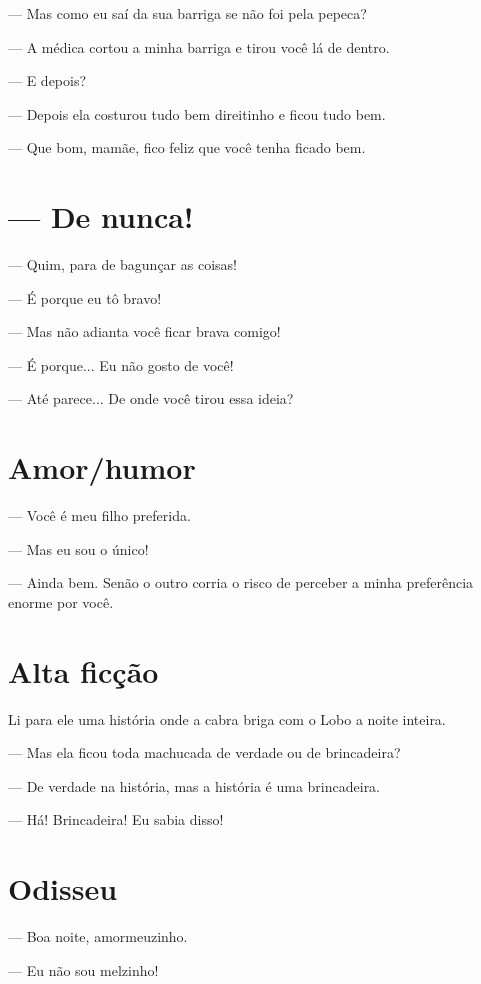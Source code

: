 {{--- Mas como eu saí da sua barriga se não foi pela pepeca?

--- A médica cortou a minha barriga e tirou você lá de dentro.

--- E depois?

--- Depois ela costurou tudo bem direitinho e ficou tudo bem.

--- Que bom, mamãe, fico feliz que você tenha ficado bem.

\chapter{--- De nunca!}\label{de-nunca}

--- Quim, para de bagunçar as coisas!

--- É porque eu tô bravo!

--- Mas não adianta você ficar brava comigo!

--- É porque... Eu não gosto de você!

--- Até parece... De onde você tirou essa ideia?

\chapter{Amor/humor}\label{amorhumor}

--- Você é meu filho preferida.

--- Mas eu sou o único!

--- Ainda bem. Senão o outro corria o risco de perceber a minha
preferência enorme por você.

\chapter{Alta ficção}\label{alta-ficuxe7uxe3o}

Li para ele uma história onde a cabra briga com o Lobo a noite inteira.

--- Mas ela ficou toda machucada de verdade ou de brincadeira?

--- De verdade na história, mas a história é uma brincadeira.

--- Há! Brincadeira! Eu sabia disso!

\chapter{Odisseu}\label{odisseu}

--- Boa noite, amormeuzinho.

--- Eu não sou melzinho!

}}
